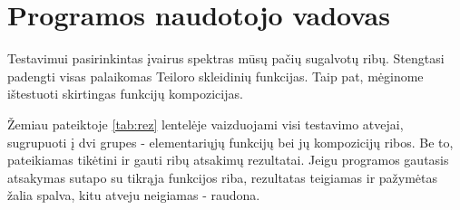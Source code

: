 \section{Programos naudotojo vadovas}

	Testavimui pasirinkintas įvairus spektras mūsų pačių sugalvotų ribų. 
	Stengtasi padengti visas palaikomas Teiloro skleidinių funkcijas.
	Taip pat, mėginome ištestuoti skirtingas funkcijų kompozicijas.
	
	Žemiau pateiktoje \ref{tab:rez} lentelėje vaizduojami visi testavimo atvejai, sugrupuoti į dvi grupes - 
	elementariųjų funkcijų bei jų kompozicijų ribos. 
	Be to, pateikiamas tikėtini ir gauti ribų atsakimų rezultatai. 
	Jeigu programos gautasis atsakymas sutapo su tikrąja funkcijos riba, 
	rezultatas teigiamas ir pažymėtas žalia spalva, kitu atveju neigiamas - raudona.